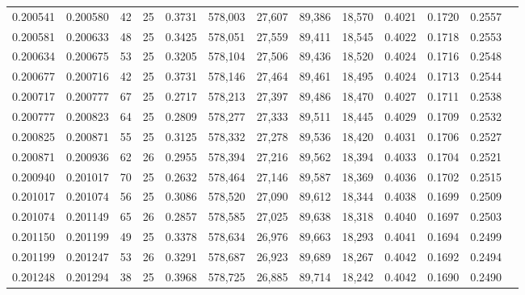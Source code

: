 \begin{tabular}{rrrrrrrrrrrrr}
0.200541 & 0.200580 &  42 &  25 &                                     0.3731 & 578,003 &  27,607 &  89,386 &  18,570 & 0.4021 & 0.1720 & 0.2557 \\
0.200581 & 0.200633 &  48 &  25 &                                     0.3425 & 578,051 &  27,559 &  89,411 &  18,545 & 0.4022 & 0.1718 & 0.2553 \\
0.200634 & 0.200675 &  53 &  25 &                                     0.3205 & 578,104 &  27,506 &  89,436 &  18,520 & 0.4024 & 0.1716 & 0.2548 \\
0.200677 & 0.200716 &  42 &  25 &                                     0.3731 & 578,146 &  27,464 &  89,461 &  18,495 & 0.4024 & 0.1713 & 0.2544 \\
0.200717 & 0.200777 &  67 &  25 &                                     0.2717 & 578,213 &  27,397 &  89,486 &  18,470 & 0.4027 & 0.1711 & 0.2538 \\
0.200777 & 0.200823 &  64 &  25 &                                     0.2809 & 578,277 &  27,333 &  89,511 &  18,445 & 0.4029 & 0.1709 & 0.2532 \\
0.200825 & 0.200871 &  55 &  25 &                                     0.3125 & 578,332 &  27,278 &  89,536 &  18,420 & 0.4031 & 0.1706 & 0.2527 \\
0.200871 & 0.200936 &  62 &  26 &                                     0.2955 & 578,394 &  27,216 &  89,562 &  18,394 & 0.4033 & 0.1704 & 0.2521 \\
0.200940 & 0.201017 &  70 &  25 &                                     0.2632 & 578,464 &  27,146 &  89,587 &  18,369 & 0.4036 & 0.1702 & 0.2515 \\
0.201017 & 0.201074 &  56 &  25 &                                     0.3086 & 578,520 &  27,090 &  89,612 &  18,344 & 0.4038 & 0.1699 & 0.2509 \\
0.201074 & 0.201149 &  65 &  26 &                                     0.2857 & 578,585 &  27,025 &  89,638 &  18,318 & 0.4040 & 0.1697 & 0.2503 \\
0.201150 & 0.201199 &  49 &  25 &                                     0.3378 & 578,634 &  26,976 &  89,663 &  18,293 & 0.4041 & 0.1694 & 0.2499 \\
0.201199 & 0.201247 &  53 &  26 &                                     0.3291 & 578,687 &  26,923 &  89,689 &  18,267 & 0.4042 & 0.1692 & 0.2494 \\
0.201248 & 0.201294 &  38 &  25 &                                     0.3968 & 578,725 &  26,885 &  89,714 &  18,242 & 0.4042 & 0.1690 & 0.2490 \\

\end{tabular}
